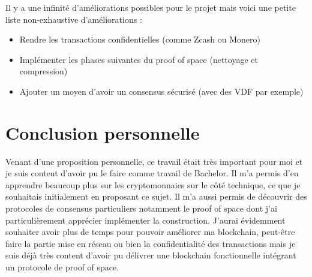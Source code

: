 Il y a une infinité d'améliorations possibles pour le projet mais voici une petite liste non-exhaustive d'améliorations :

\begin{itemize}
  \item Rendre les transactions confidentielles (comme Zcash ou Monero)
  \item Implémenter les phases suivantes du proof of space (nettoyage et compression)
  \item Ajouter un moyen d'avoir un consensus sécurisé (avec des VDF par exemple)
\end{itemize}

\section{Conclusion personnelle}

Venant d'une proposition personnelle, ce travail était très important pour moi et je suis content d'avoir pu le faire comme travail de Bachelor. Il m'a permis d'en apprendre beaucoup plus sur les cryptomonnaies sur le côté technique, ce que je souhaitais initialement en proposant ce sujet. Il m'a aussi permis de découvrir des protocoles de consensus particuliers notamment le proof of space dont j'ai particulièrement apprécier implémenter la construction. J'aurai évidemment souhaiter avoir plus de temps pour pouvoir améliorer ma blockchain, peut-être faire la partie mise en réseau ou bien la confidentialité des transactions mais je suis déjà très content d'avoir pu délivrer une blockchain fonctionnelle intégrant un protocole de proof of space.